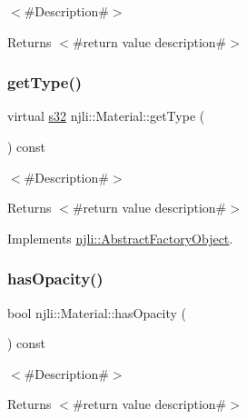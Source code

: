 $<$\#\+Description\#$>$

\begin{DoxyReturn}{Returns}
$<$\#return value description\#$>$ 
\end{DoxyReturn}
\mbox{\label{classnjli_1_1_material_a13708ffb8342a5d988d0acddb31af07f}} 
\subsubsection{\texorpdfstring{get\+Type()}{getType()}}
{\footnotesize\ttfamily virtual \mbox{\hyperlink{_util_8h_aa62c75d314a0d1f37f79c4b73b2292e2}{s32}} njli\+::\+Material\+::get\+Type (\begin{DoxyParamCaption}{ }\end{DoxyParamCaption}) const\hspace{0.3cm}{\ttfamily [virtual]}}

$<$\#\+Description\#$>$

\begin{DoxyReturn}{Returns}
$<$\#return value description\#$>$ 
\end{DoxyReturn}


Implements \mbox{\hyperlink{classnjli_1_1_abstract_factory_object_a207c86146d40d0794708ae7f2d4e60a7}{njli\+::\+Abstract\+Factory\+Object}}.

\mbox{\label{classnjli_1_1_material_a51aefb6e0eec43c7a19f70fce8e04ef8}} 
\subsubsection{\texorpdfstring{has\+Opacity()}{hasOpacity()}}
{\footnotesize\ttfamily bool njli\+::\+Material\+::has\+Opacity (\begin{DoxyParamCaption}{ }\end{DoxyParamCaption}) const}

$<$\#\+Description\#$>$

\begin{DoxyReturn}{Returns}
$<$\#return value description\#$>$ 
\end{DoxyReturn}
\mbox{\label{classnjli_1_1_material_a8b9cd58b0b79154a5d4a813d86d91417}} 
